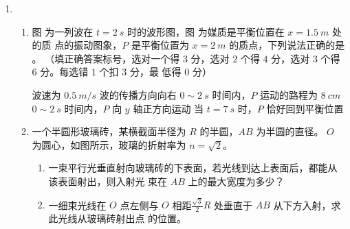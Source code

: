 

\begin{enumerate}
	\item
{}
\begin{enumerate}
	\item
图  为一列波在 $ t  =2 \ s $ 时的波形图，图  为媒质是平衡位置在 $ x=1.5 \ m $ 处的质
点的振动图象，$ P $ 是平衡位置为 $ x=2 \ m $ 的质点，下列说法正确的是 \underlinegap 。
（填正确答案标号，选对一个得 $ 3 $ 分，选对 $ 2 $ 个得 $ 4 $ 分，选对 $ 3 $ 个得 $ 6 $ 分。每选错 $ 1 $ 个扣 $ 3 $ 分，最
低得 $ 0 $ 分）
\begin{figure}[h!]
	\centering
\begin{subfigure}{0.4\linewidth}
	\centering
	 
	\caption{}\label{2014全国134a}
\end{subfigure}
\begin{subfigure}{0.4\linewidth}
	\centering
	 
	\caption{}\label{2014全国134b}
\end{subfigure}
\end{figure}

\fivechoices
{波速为 $ 0.5 \ m /s $}
{波的传播方向向右}
{$ 0 \sim 2 \ s $ 时间内，$ P $ 运动的路程为 $ 8 \ cm $}
{$ 0 \sim 2 \ s $ 时间内，$ P $ 向 $ y $ 轴正方向运动}
{当 $ t =7 \ s $ 时，$ P $ 恰好回到平衡位置}



\item 
一个半圆形玻璃砖，某横截面半径为 $ R $ 的半圆，$ AB $ 为半圆的直径。
$ O $ 为圆心，如图所示，玻璃的折射率为 $ n=\sqrt{2} $。
\begin{enumerate}
	\item
一束平行光垂直射向玻璃砖的下表面，若光线到达上表面后，都能从该表面射出，则入射光
束在 $ AB $ 上的最大宽度为多少？
\item 
一细束光线在 $ O $ 点左侧与 $ O $ 相距$ \frac{\sqrt{3}}{2} R $ 处垂直于 $ AB $ 从下方入射，求此光线从玻璃砖射出点
的位置。


\end{enumerate}
\end{enumerate}
\end{enumerate}
